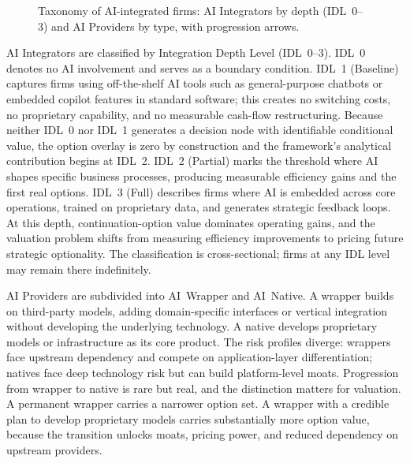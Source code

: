 \documentclass[oneside,10pt]{swissi}
\begin{document}
\begin{figure}[htbp]
\caption{Taxonomy of AI-integrated firms: AI Integrators by depth (IDL~0--3) and AI Providers by type, with progression arrows.}
\label{fig:taxonomy}
\end{figure}

AI Integrators are classified by Integration Depth Level (IDL~0--3). IDL~0 denotes no AI involvement and serves as a boundary condition. IDL~1 (Baseline) captures firms using off-the-shelf AI tools such as general-purpose chatbots or embedded copilot features in standard software; this creates no switching costs, no proprietary capability, and no measurable cash-flow restructuring. Because neither IDL~0 nor IDL~1 generates a decision node with identifiable conditional value, the option overlay is zero by construction and the framework's analytical contribution begins at IDL~2. IDL~2 (Partial) marks the threshold where AI shapes specific business processes, producing measurable efficiency gains and the first real options. IDL~3 (Full) describes firms where AI is embedded across core operations, trained on proprietary data, and generates strategic feedback loops. At this depth, continuation-option value dominates operating gains, and the valuation problem shifts from measuring efficiency improvements to pricing future strategic optionality. The classification is cross-sectional; firms at any IDL level may remain there indefinitely.

AI Providers are subdivided into AI~Wrapper and AI~Native. A wrapper builds on third-party models, adding domain-specific interfaces or vertical integration without developing the underlying technology. A native develops proprietary models or infrastructure as its core product. The risk profiles diverge: wrappers face upstream dependency and compete on application-layer differentiation; natives face deep technology risk but can build platform-level moats. Progression from wrapper to native is rare but real, and the distinction matters for valuation. A permanent wrapper carries a narrower option set. A wrapper with a credible plan to develop proprietary models carries substantially more option value, because the transition unlocks moats, pricing power, and reduced dependency on upstream providers.
\end{document}

